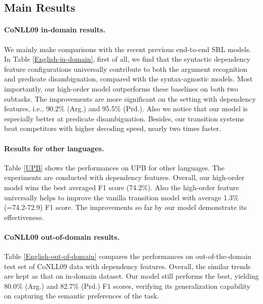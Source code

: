 \documentclass[letterpaper]{article} \usepackage{aaai21}  \usepackage{times}  \usepackage{helvet} \usepackage{courier}  \usepackage[hyphens]{url}  \usepackage{graphicx} \urlstyle{rm} \def\UrlFont{\rm}  \usepackage{natbib}  \usepackage{caption}
\begin{document}
\begin{CJK}{UTF8}{gbsn}
\subsection{Main Results}

\paragraph{CoNLL09 in-domain results.}

We mainly make comparisons with the recent previous end-to-end SRL models.
In Table \ref{English-in-domain}, first of all, we find that the syntactic dependency feature configurations universally contribute to both the argument recognition and predicate disambiguation, compared with the syntax-agnostic models.
Most importantly, our high-order model outperforms these baselines on both two subtasks.
The improvements are more significant on the setting with dependency features, i.e., 90.2\% (Arg.) and 95.5\% (Prd.).
Also we notice that our model is especially better at predicate disambiguation.
Besides, our transition systems beat competitors with higher decoding speed, nearly two times faster.





\paragraph{Results for other languages.}
Table \ref{UPB} shows the performances on UPB for other languages.
The experiments are conducted with dependency features.
Overall, our high-order model wins the best averaged F1 score (74.2\%).
Also the high-order feature universally helps to improve the vanilla transition model with average 1.3\%(=74.2-72.9) F1 score.
The improvements so far by our model demonstrate its effectiveness.






\paragraph{CoNLL09 out-of-domain results.}

Table \ref{English-out-of-domain} compares the performances on out-of-the-domain test set of CoNLL09 data with dependency features.
Overall, the similar trends are kept as that on in-domain dataset.
Our model still performs the best, yielding 80.0\% (Arg.) and 82.7\% (Prd.) F1 scores, verifying its generalization capability on capturing the semantic preferences of the task.









\end{CJK}
\end{document}
